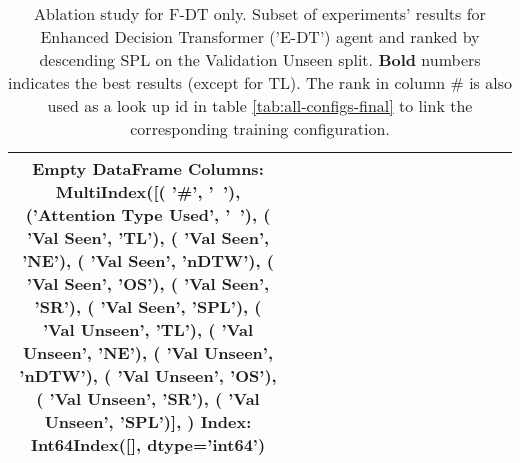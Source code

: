 \begin{table}
\centering
\caption{\label{tab:e_dt_full_dt_ablation}Ablation study for F-DT only. Subset of experiments' results for Enhanced Decision Transformer ('E-DT') agent and ranked by descending SPL on the Validation Unseen split. \textbf{Bold} numbers indicates the best results (except for TL). The rank in column \# is also used as a look up id in table \ref{tab:all-configs-final} to link the corresponding training configuration.}
\begin{tabular}{@{\hskip3pt}c@{\hskip3pt}c@{\hskip3pt}c@{\hskip3pt}c@{\hskip3pt}c@{\hskip3pt}c@{\hskip3pt}c@{\hskip3pt}c@{\hskip3pt}c@{\hskip3pt}c@{\hskip3pt}c@{\hskip3pt}c@{\hskip3pt}c@{\hskip3pt}c@{\hskip3pt}c}
\toprule
Empty DataFrame
Columns: MultiIndex([(                 '\textbf{\#}',    '\textbf{~}'),
            ('\textbf{Attention Type Used}',    '\textbf{~}'),
            (           '\textbf{Val Seen}',   '\textbf{TL}'),
            (           '\textbf{Val Seen}',   '\textbf{NE}'),
            (           '\textbf{Val Seen}', '\textbf{nDTW}'),
            (           '\textbf{Val Seen}',   '\textbf{OS}'),
            (           '\textbf{Val Seen}',   '\textbf{SR}'),
            (           '\textbf{Val Seen}',  '\textbf{SPL}'),
            (         '\textbf{Val Unseen}',   '\textbf{TL}'),
            (         '\textbf{Val Unseen}',   '\textbf{NE}'),
            (         '\textbf{Val Unseen}', '\textbf{nDTW}'),
            (         '\textbf{Val Unseen}',   '\textbf{OS}'),
            (         '\textbf{Val Unseen}',   '\textbf{SR}'),
            (         '\textbf{Val Unseen}',  '\textbf{SPL}')],
           )
Index: Int64Index([], dtype='int64') \\
\bottomrule
\end{tabular}
\end{table}

